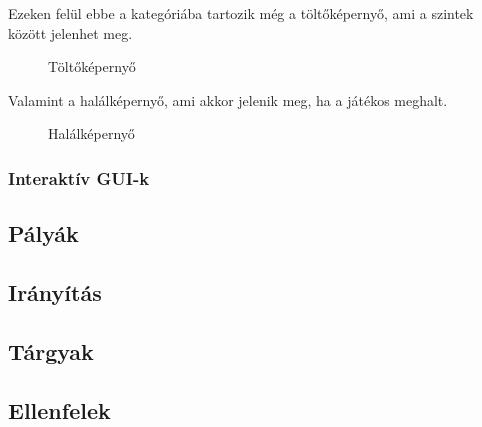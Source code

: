 Ezeken felül ebbe a kategóriába tartozik még a töltőképernyő, ami a szintek között jelenhet meg.
\begin{figure}[H]
	\noindent{}
	\caption{Töltőképernyő}
	\label{loading}
\end{figure}

\newpage
Valamint a halálképernyő, ami akkor jelenik meg, ha a játékos meghalt.
\begin{figure}[H]
	\noindent{}
	\caption{Halálképernyő}
	\label{dead}
\end{figure}

\subsubsection{Interaktív GUI-k}

\subsection{Pályák}
\subsection{Irányítás}
\subsection{Tárgyak}
\subsection{Ellenfelek}